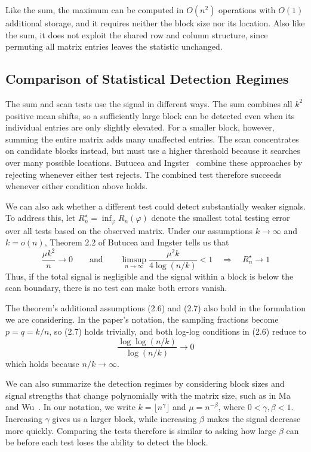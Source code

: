 \documentclass[12pt]{article}
\begin{document}
Like the sum, the maximum can be computed in $O(n^2)$ operations with
$O(1)$ additional storage, and it requires neither the block size nor its
location. Also like the sum, it does not exploit the shared row and
column structure, since permuting all matrix entries leaves the
statistic unchanged.

\subsection{Comparison of Statistical Detection Regimes}\label{sec:comparison}

The sum and scan tests use the signal in different ways. The sum
combines all $k^2$ positive mean shifts, so a sufficiently large block
can be detected even when its individual entries are only slightly
elevated. For a smaller block, however, summing the entire matrix adds
many unaffected entries. The scan concentrates on candidate blocks
instead, but must use a higher threshold because it searches over many
possible locations. Butucea and Ingster~\cite[Theorem 2.1]{BI2013}
combine these approaches by rejecting whenever either test rejects.
The combined test therefore succeeds whenever either condition above
holds.

We can also ask whether a different test could detect substantially
weaker signals. To address this, let
$R_n^\star=\inf_\varphi R_n(\varphi)$ denote the smallest total testing
error over all tests based on the observed matrix. Under our assumptions
$k\to\infty$ and $k=o(n)$, Theorem 2.2 of Butucea and Ingster tells us that
\[
\frac{\mu k^2}{n}\longrightarrow0
\qquad\text{and}\qquad
\limsup_{n\to\infty}\frac{\mu^2k}{4\log(n/k)}<1
\quad\Longrightarrow\quad R_n^\star\longrightarrow1
\]
Thus, if the total signal is negligible and the signal within a block
is below the scan boundary, there is no test can make both errors vanish.

The theorem's additional assumptions (2.6) and (2.7) also hold in the formulation we are considering. In the paper's notation, the sampling fractions become $p=q=k/n$,
so (2.7) holds trivially, and both log-log conditions in (2.6) reduce to
\[
\frac{\log\log(n/k)}{\log(n/k)}\longrightarrow0
\]
which holds because $n/k\to\infty$. 

We can also summarize the detection regimes
by considering block sizes and signal strengths that change
polynomially with the matrix size, such as in Ma and Wu~\cite[Section 1.2]{MW2015}. In our notation, we write
$k=\lfloor n^\gamma\rfloor$ and $\mu=n^{-\beta}$, where
$0<\gamma,\beta<1$. Increasing $\gamma$ gives us a larger block, while
increasing $\beta$ makes the signal decrease more quickly. Comparing
the tests therefore is similar to asking how large $\beta$ can be before
each test loses the ability to detect the block.
\end{document}
